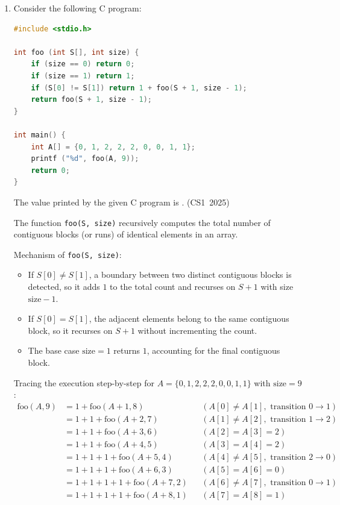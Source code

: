 \begin{enumerate}[label=\thesubsection.\arabic*, ref=\thesubsection.\theenumi]
\vspace{0.5cm}
\item Consider the following C program:
\begin{lstlisting}[language=C]
#include <stdio.h>

int foo (int S[], int size) {
    if (size == 0) return 0;
    if (size == 1) return 1;
    if (S[0] != S[1]) return 1 + foo(S + 1, size - 1);
    return foo(S + 1, size - 1);
}

int main() {
    int A[] = {0, 1, 2, 2, 2, 0, 0, 1, 1};
    printf ("%d", foo(A, 9));
    return 0;
}
\end{lstlisting}
The value printed by the given C program is \underline{\hspace{1cm}}.
\hfill (CS1~2025)

\vspace{0.2cm}
\solution
The function \texttt{foo(S, size)} recursively computes the total number of contiguous blocks (or runs) of identical elements in an array.

Mechanism of \texttt{foo(S, size)}:
\begin{itemize}
    \item If $S[0] \neq S[1]$, a boundary between two distinct contiguous blocks is detected, so it adds $1$ to the total count and recurses on $S+1$ with size $\text{size} - 1$.
    \item If $S[0] = S[1]$, the adjacent elements belong to the same contiguous block, so it recurses on $S+1$ without incrementing the count.
    \item The base case $\text{size} = 1$ returns $1$, accounting for the final contiguous block.
\end{itemize}

Tracing the execution step-by-step for $A = \{0, 1, 2, 2, 2, 0, 0, 1, 1\}$ with $\text{size} = 9$:
\begin{align}
\text{foo}(A, 9) &= 1 + \text{foo}(A+1, 8) && (A[0] \neq A[1], \text{ transition } 0 \to 1) \\
&= 1 + 1 + \text{foo}(A+2, 7) && (A[1] \neq A[2], \text{ transition } 1 \to 2) \\
&= 1 + 1 + \text{foo}(A+3, 6) && (A[2] = A[3] = 2) \\
&= 1 + 1 + \text{foo}(A+4, 5) && (A[3] = A[4] = 2) \\
&= 1 + 1 + 1 + \text{foo}(A+5, 4) && (A[4] \neq A[5], \text{ transition } 2 \to 0) \\
&= 1 + 1 + 1 + \text{foo}(A+6, 3) && (A[5] = A[6] = 0) \\
&= 1 + 1 + 1 + 1 + \text{foo}(A+7, 2) && (A[6] \neq A[7], \text{ transition } 0 \to 1) \\
&= 1 + 1 + 1 + 1 + \text{foo}(A+8, 1) && (A[7] = A[8] = 1)
\end{align}


\end{enumerate}
